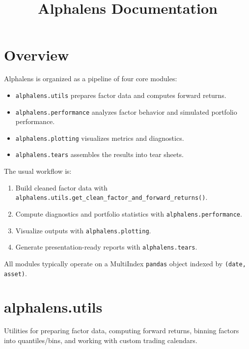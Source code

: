 \documentclass[11pt]{article}
\begin{document}
\title{\Huge{Alphalens Documentation}}
\date{}

\maketitle

\tableofcontents

\newpage

\section{Overview}

Alphalens is organized as a pipeline of four core modules:

\begin{itemize}
  \item \texttt{alphalens.utils} prepares factor data and computes forward returns.
  \item \texttt{alphalens.performance} analyzes factor behavior and simulated portfolio performance.
  \item \texttt{alphalens.plotting} visualizes metrics and diagnostics.
  \item \texttt{alphalens.tears} assembles the results into tear sheets.
\end{itemize}

The usual workflow is:

\begin{enumerate}
  \item Build cleaned factor data with \texttt{alphalens.utils.get\_clean\_factor\_and\_forward\_returns()}.
  \item Compute diagnostics and portfolio statistics with \texttt{alphalens.performance}.
  \item Visualize outputs with \texttt{alphalens.plotting}.
  \item Generate presentation-ready reports with \texttt{alphalens.tears}.
\end{enumerate}

All modules typically operate on a MultiIndex \texttt{pandas} object indexed by \texttt{(date, asset)}.

\section{alphalens.utils}

Utilities for preparing factor data, computing forward returns, binning factors into quantiles/bins, and working with custom trading calendars.
\end{document}
